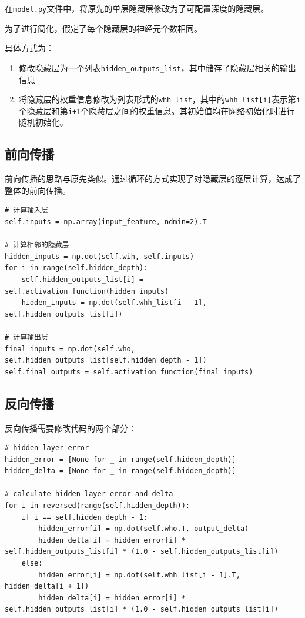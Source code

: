 \documentclass[12pt,a4paper]{article}
\begin{document}
在\texttt{model.py}文件中，将原先的单层隐藏层修改为了可配置深度的隐藏层。

为了进行简化，假定了每个隐藏层的神经元个数相同。

具体方式为：

\begin{enumerate}
\item
  修改隐藏层为一个列表\texttt{hidden\_outputs\_list}，其中储存了隐藏层相关的输出信息
\item
  将隐藏层的权重信息修改为列表形式的\texttt{whh\_list}，其中的\texttt{whh\_list{[}i{]}}表示第\texttt{i}个隐藏层和第\texttt{i+1}个隐藏层之间的权重信息。其初始值均在网络初始化时进行随机初始化。
\end{enumerate}

\subsection{前向传播}

前向传播的思路与原先类似。通过循环的方式实现了对隐藏层的逐层计算，达成了整体的前向传播。

\begin{lstlisting}
# 计算输入层
self.inputs = np.array(input_feature, ndmin=2).T

# 计算相邻的隐藏层
hidden_inputs = np.dot(self.wih, self.inputs)
for i in range(self.hidden_depth):
    self.hidden_outputs_list[i] = self.activation_function(hidden_inputs)
    hidden_inputs = np.dot(self.whh_list[i - 1], self.hidden_outputs_list[i])

# 计算输出层
final_inputs = np.dot(self.who, self.hidden_outputs_list[self.hidden_depth - 1])
self.final_outputs = self.activation_function(final_inputs)
\end{lstlisting}

\subsection{反向传播}

反向传播需要修改代码的两个部分：

\begin{lstlisting}
# hidden layer error
hidden_error = [None for _ in range(self.hidden_depth)]
hidden_delta = [None for _ in range(self.hidden_depth)]

# calculate hidden layer error and delta
for i in reversed(range(self.hidden_depth)):
    if i == self.hidden_depth - 1:
        hidden_error[i] = np.dot(self.who.T, output_delta)
        hidden_delta[i] = hidden_error[i] * self.hidden_outputs_list[i] * (1.0 - self.hidden_outputs_list[i])
    else:
        hidden_error[i] = np.dot(self.whh_list[i - 1].T, hidden_delta[i + 1])
        hidden_delta[i] = hidden_error[i] * self.hidden_outputs_list[i] * (1.0 - self.hidden_outputs_list[i])
\end{lstlisting}
\end{document}
